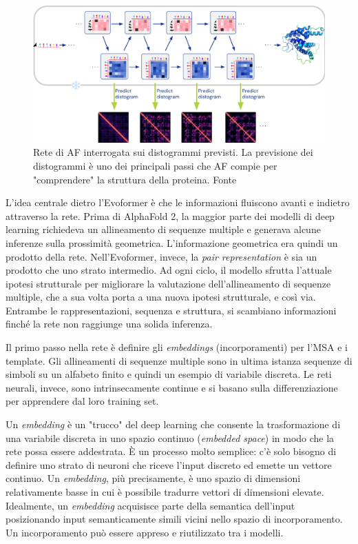 \begin{figure}[!htb]
	\centering
	\includegraphics[scale=0.42]{images/evoformer2.png}
	\caption{Rete di AF interrogata sui distogrammi previsti. La previsione dei distogrammi è uno dei principali passi che AF compie per "comprendere" la struttura della proteina. Fonte\cite{AFslide}}
	\label{fig:evoformer-distogram}
\end{figure}

\par L'idea centrale dietro l'Evoformer è che le informazioni fluiscono avanti e indietro attraverso la rete. Prima di AlphaFold 2, la maggior parte dei modelli di deep learning richiedeva un allineamento di sequenze multiple e generava alcune inferenze sulla prossimità geometrica. L'informazione geometrica era quindi un prodotto della rete. Nell'Evoformer, invece, la \textit{pair representation} è sia un prodotto che uno strato intermedio. Ad ogni ciclo, il modello sfrutta l'attuale ipotesi strutturale per migliorare la valutazione dell'allineamento di sequenze multiple, che a sua volta porta a una nuova ipotesi strutturale, e così via. Entrambe le rappresentazioni, sequenza e struttura, si scambiano informazioni finché la rete non raggiunge una solida inferenza.

Il primo passo nella rete è definire gli \textit{embeddings} (incorporamenti) per l'MSA e i template. Gli allineamenti di sequenze multiple sono in ultima istanza sequenze di simboli su un alfabeto finito e quindi un esempio di variabile discreta. Le reti neurali, invece, sono intrinsecamente continue e si basano sulla differenziazione per apprendere dal loro training set. 

\par Un \textit{embedding} è un "trucco" del deep learning che consente la trasformazione di una variabile discreta in uno spazio continuo (\textit{embedded space}) in modo che la rete possa essere addestrata. È un processo molto semplice: c'è solo bisogno di definire uno strato di neuroni che riceve l'input discreto ed emette un vettore continuo. Un \textit{embedding}, più precisamente, è uno spazio di dimensioni relativamente basse in cui è possibile tradurre vettori di dimensioni elevate.  Idealmente, un \textit{embedding} acquisisce parte della semantica dell'input posizionando input semanticamente simili vicini nello spazio di incorporamento.  Un incorporamento può essere appreso e riutilizzato tra i modelli.

